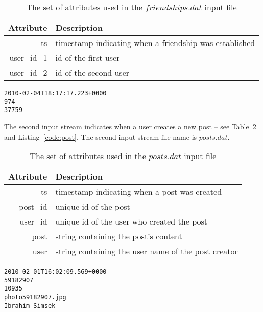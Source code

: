 \documentclass{sig-alternate}
\begin{document}

\begin{table}[ht]
	\caption{The set of attributes used in the $friendships.dat$ input file}
	\centering 
	\begin{tabular}{r p{5.2cm}}
		\toprule
		Attribute		&	 Description\\
		\midrule
		ts			&	timestamp indicating when a friendship was established\\[2ex]
		user\_id\_1	&	id of the first user\\[2ex]
		user\_id\_2	&	id of the second user\\[2ex]		
		\bottomrule 
	\end{tabular}
	\label{table:friend}
\end{table}



\lstset{}
\begin{lstlisting}[float=ht,caption={First line from the $friendships.dat$ file -- one attribute per line of listing},label={code:friend}]
2010-02-04T18:17:17.223+0000
974
37759
\end{lstlisting}	

The second input stream indicates when a user creates a new post -- see Table~\ref{table:post} and Listing~\ref{code:post}. The second input stream file name is $posts.dat$.

\begin{table}[ht]
	\caption{The set of attributes used in the $posts.dat$ input file}
	\centering 
	\begin{tabular}{r p{5.2cm}}
		\toprule
		Attribute		&	 Description\\
		\midrule
		ts			&	timestamp indicating when a post was created\\[2ex]
		post\_id	&	unique id of the post\\[2ex]
		user\_id	&	unique id of the user who created the post\\[2ex]		
		post		& 	string containing the post's content\\[2ex]		
		user		&   string containing the user name of the post creator\\[2ex]
		\bottomrule 
	\end{tabular}
	\label{table:post}
\end{table}

\lstset{}
\begin{lstlisting}[float=ht,caption={First line from the $posts.dat$ file -- one attribute per line of listing},label={code:post}]
2010-02-01T16:02:09.569+0000
59182907
10935
photo59182907.jpg
Ibrahim Simsek
\end{lstlisting}
\end{document}
